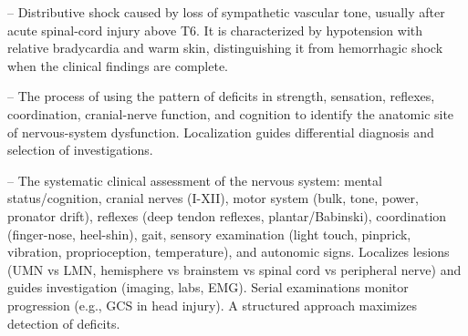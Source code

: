 -- Distributive shock caused by loss of sympathetic vascular tone, usually after acute spinal-cord injury above T6. It is characterized by hypotension with relative bradycardia and warm skin, distinguishing it from hemorrhagic shock when the clinical findings are complete.

-- The process of using the pattern of deficits in strength, sensation, reflexes, coordination, cranial-nerve function, and cognition to identify the anatomic site of nervous-system dysfunction. Localization guides differential diagnosis and selection of investigations.

-- The systematic clinical assessment of the nervous system: mental status/cognition, cranial nerves (I-XII), motor system (bulk, tone, power, pronator drift), reflexes (deep tendon reflexes, plantar/Babinski), coordination (finger-nose, heel-shin), gait, sensory examination (light touch, pinprick, vibration, proprioception, temperature), and autonomic signs. Localizes lesions (UMN vs LMN, hemisphere vs brainstem vs spinal cord vs peripheral nerve) and guides investigation (imaging, labs, EMG). Serial examinations monitor progression (e.g., GCS in head injury). A structured approach maximizes detection of deficits.

